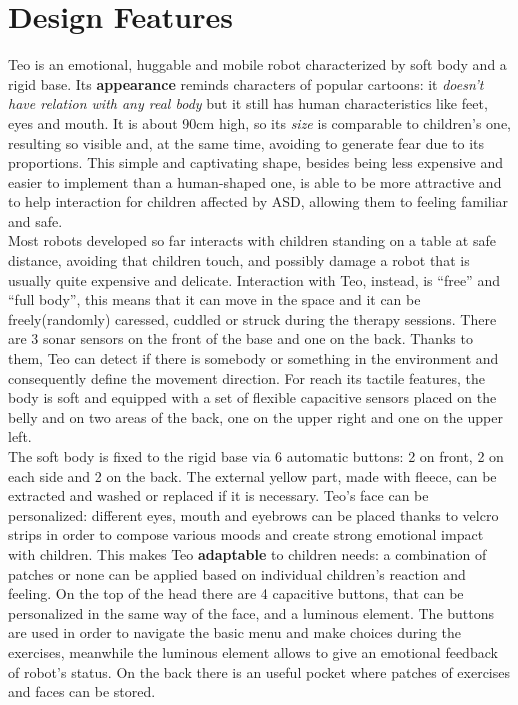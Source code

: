\section{Design Features}\label{designFunct} 
Teo is an emotional, huggable and mobile robot characterized by soft body and a rigid base. Its \textbf{appearance} reminds characters of popular cartoons: it \textit{doesn't have relation with any real body} but it still has human characteristics like feet, eyes and mouth. It is about 90cm high, so its \textit{size} is comparable to children's one, resulting so visible and, at the same time, avoiding to generate fear due to its proportions. This simple and captivating shape, besides being less expensive and easier to implement than a human-shaped one, is able to be more attractive and to help interaction for children affected by ASD, allowing them to feeling familiar and safe.\\
Most robots developed so far interacts with children standing on a table at safe distance, avoiding that children touch, and possibly damage a robot that is usually quite expensive and delicate. Interaction with Teo, instead, is “free” and “full body”, this means that it can move in the space and it can be freely(randomly) caressed, cuddled or struck during the therapy sessions. There are 3 sonar sensors on the front of the base and one on the back. Thanks to them, Teo can detect if there is somebody or something in the environment and consequently define the movement direction. For reach its tactile features, the body is soft and equipped with a set of flexible capacitive sensors placed on the belly and on two areas of the back, one on the upper right and one on the upper left.\\
The soft body is fixed to the rigid base via 6 automatic buttons: 2 on front, 2 on each side and 2 on the back. The external yellow part, made with fleece, can be extracted and washed or replaced if it is necessary. Teo's face can be personalized: different eyes, mouth and eyebrows can be placed thanks to velcro strips in order to compose various moods and create strong emotional impact with children. This makes Teo \textbf{adaptable} to children needs:
a combination of patches or none can be applied based on individual children's reaction and feeling.
On the top of the head there are 4 capacitive buttons, that can be personalized in the same way of the face, and a luminous element. The buttons are used in order to navigate the basic menu and make choices during the exercises, meanwhile the luminous element allows to give an emotional feedback of robot’s status. On the back there is an useful pocket where patches of exercises and faces can be stored.\\
